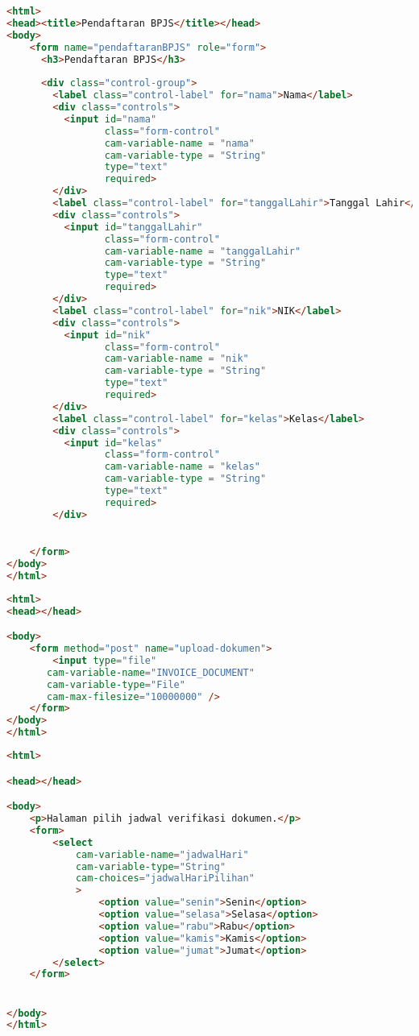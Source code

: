 \begin{lstlisting}[language=html,basicstyle=\tiny,caption=pendaftaran-bpjs.html]
<html>
<head><title>Pendaftaran BPJS</title></head>
<body>
	<form name="pendaftaranBPJS" role="form">
	  <h3>Pendaftaran BPJS</h3>
	  
	  <div class="control-group">
		<label class="control-label" for="nama">Nama</label>
	    <div class="controls">
	      <input id="nama"
	             class="form-control"
	             cam-variable-name = "nama"
	             cam-variable-type = "String"
	             type="text"
	             required>
	    </div>	
		<label class="control-label" for="tanggalLahir">Tanggal Lahir</label>
	    <div class="controls">
	      <input id="tanggalLahir"
	             class="form-control"
	             cam-variable-name = "tanggalLahir"
	             cam-variable-type = "String"
	             type="text"
	             required>
	    </div>		
		<label class="control-label" for="nik">NIK</label>
	    <div class="controls">
	      <input id="nik"
	             class="form-control"
	             cam-variable-name = "nik"
	             cam-variable-type = "String"
	             type="text"
	             required>
	    </div>		
		<label class="control-label" for="kelas">Kelas</label>
	    <div class="controls">
	      <input id="kelas"
	             class="form-control"
	             cam-variable-name = "kelas"
	             cam-variable-type = "String"
	             type="text"
	             required>
	    </div>
	    

	</form>
</body>
</html>
\end{lstlisting}

\begin{lstlisting}[language=html,basicstyle=\tiny,caption=upload-dokumen.html]
<html>
<head></head>

<body>
	<form method="post" name="upload-dokumen">
		<input type="file"
       cam-variable-name="INVOICE_DOCUMENT"
       cam-variable-type="File"
       cam-max-filesize="10000000" />
	</form>
</body>
</html>
\end{lstlisting}

\begin{lstlisting}[language=html,basicstyle=\tiny,caption=pilih-jadwal.html]
<html>

<head></head>

<body>
	<p>Halaman pilih jadwal verifikasi dokumen.</p>
	<form>
		<select 
			cam-variable-name="jadwalHari"
			cam-variable-type="String"
	        cam-choices="jadwalHariPilihan"
	        >
		  		<option value="senin">Senin</option>
		  		<option value="selasa">Selasa</option>
		  		<option value="rabu">Rabu</option>
		  		<option value="kamis">Kamis</option>
		  		<option value="jumat">Jumat</option>
		</select>
	</form>


</body>
</html>
\end{lstlisting}

